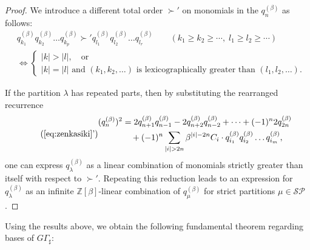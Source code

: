 \documentclass[dvipdfmx]{amsart}
\theoremstyle{definition}
\theoremstyle{remark}
\begin{document}
\begin{proof}
We introduce a different total order \( \succ' \) on monomials in the \( q_n^{(\beta)} \) as follows:
\[
\begin{aligned}
& q_{k_1}^{(\beta)} q_{k_2}^{(\beta)} \dots q_{k_p}^{(\beta)} 
\succ' 
q_{l_1}^{(\beta)} q_{l_2}^{(\beta)} \dots q_{l_r}^{(\beta)} 
\qquad (k_1 \geq k_2 \geq \cdots,\; l_1 \geq l_2 \geq \cdots)
\\
& \iff
\begin{cases}
|k| > |l|,\quad \text{or} \\
|k| = |l| \text{ and } (k_1, k_2, \dots) 
\text{ is lexicographically greater than } (l_1, l_2, \dots).
\end{cases}
\end{aligned}
\]

If the partition \( \lambda \) has repeated parts, then by substituting the rearranged recurrence
\begin{equation}\tag{\ref{eq:zenkasiki}'}
\begin{aligned}
(q_n^{(\beta)})^2 &= 
2 q_{n+1}^{(\beta)} q_{n-1}^{(\beta)} 
- 2 q_{n+2}^{(\beta)} q_{n-2}^{(\beta)} 
+ \cdots 
+ (-1)^n 2 q_{2n}^{(\beta)} \\
& \quad 
+ (-1)^n \sum_{|i| > 2n} \beta^{|i| - 2n} C_i \cdot 
q_{i_1}^{(\beta)} q_{i_2}^{(\beta)} \dots q_{i_m}^{(\beta)},
\end{aligned}
\end{equation}
one can express \( q_\lambda^{(\beta)} \) as a linear combination of monomials strictly greater than itself with respect to \( \succ' \).
Repeating this reduction leads to an expression for \( q_\lambda^{(\beta)} \) as an infinite \( \mathbb{Z}[\beta] \)-linear combination of \( q_\mu^{(\beta)} \) for strict partitions \( \mu \in \mathcal{SP} \).
\end{proof}

Using the results above, we obtain the following fundamental theorem regarding bases of \( G\Gamma_\sharp \):
\end{document}
